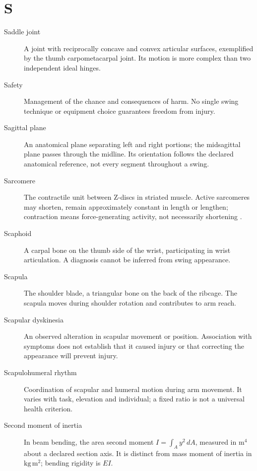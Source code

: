 \section*{S}
\begin{description}

\item[Saddle joint] A joint with reciprocally concave and convex articular surfaces, exemplified by the thumb carpometacarpal joint. Its motion is more complex than two independent ideal hinges.

\item[Safety] Management of the chance and consequences of harm. No single swing technique or equipment choice guarantees freedom from injury.

\item[Sagittal plane] An anatomical plane separating left and right portions; the midsagittal plane passes through the midline. Its orientation follows the declared anatomical reference, not every segment throughout a swing.

\item[Sarcomere] The contractile unit between Z-discs in striated muscle. Active sarcomeres may shorten, remain approximately constant in length or lengthen; contraction means force-generating activity, not necessarily shortening \citep{glossaryMuscleTension}.

\item[Scaphoid] A carpal bone on the thumb side of the wrist, participating in wrist articulation. A diagnosis cannot be inferred from swing appearance.

\item[Scapula] The shoulder blade, a triangular bone on the back of the ribcage. The scapula moves during shoulder rotation and contributes to arm reach.

\item[Scapular dyskinesia] An observed alteration in scapular movement or position. Association with symptoms does not establish that it caused injury or that correcting the appearance will prevent injury.

\item[Scapulohumeral rhythm] Coordination of scapular and humeral motion during arm movement. It varies with task, elevation and individual; a fixed ratio is not a universal health criterion.

\item[Second moment of inertia] In beam bending, the area second moment $I=\int_A y^2\,dA$, measured in $\mathrm{m^4}$ about a declared section axis. It is distinct from mass moment of inertia in $\mathrm{kg\,m^2}$; bending rigidity is $EI$.


\end{description}
